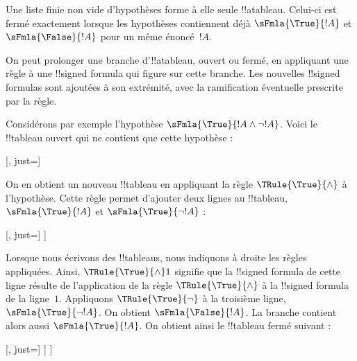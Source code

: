 \documentclass[../../../include/open-logic-section]{subfiles}
\begin{document}
\begin{ex}
  Une liste finie non vide d'hypothèses forme à elle seule
  !!a{tableau}. Celui-ci est fermé exactement lorsque les
  hypothèses contiennent déjà $\sFmla{\True}{!A}$ et
  $\sFmla{\False}{!A}$ pour un même énoncé~$!A$.

  On peut prolonger une branche d'!!a{tableau}, ouvert ou
  fermé, en appliquant une règle à une !!{signed formula} qui
  figure sur cette branche. Les nouvelles !!{signed formula}s
  sont ajoutées à son extrémité, avec la ramification éventuelle
  prescrite par la règle.

  Considérons par exemple l'hypothèse $\sFmla{\True}{!A \land \lnot
    !A}$. Voici le !!{tableau} ouvert qui ne contient que cette hypothèse :
  \begin{center}
    \begin{tableau}{}
      [, just=\TAss]
    \end{tableau}{}
  \end{center}
  On en obtient un nouveau !!{tableau} en appliquant la règle
  $\TRule{\True}{\land}$ à l'hypothèse. Cette règle permet d'ajouter
  deux lignes au !!{tableau}, $\sFmla{\True}{!A}$ et
  $\sFmla{\True}{\lnot !A}$ :
  \begin{center}
    \begin{tableau}{}
      [, just=\TAss
        [\sFmla{\True}{\formula{A}}, just={\TRule{\True}{\land}[1]},
          [\sFmla{\True}{\lnot \formula{A}}, just={\TRule{\True}{\land}[1]}
          ]
        ]
      ]
    \end{tableau}{}
  \end{center}
  Lorsque nous écrivons des !!{tableau}s, nous indiquons à droite les
  règles appliquées. Ainsi, $\TRule{\True}{\land} 1$ signifie que la
  !!{signed formula} de cette ligne résulte de l'application de la règle
  $\TRule{\True}{\land}$ à la !!{signed formula} de la ligne~$1$.
  Appliquons $\TRule{\True}{\lnot}$ à la troisième ligne,
  $\sFmla{\True}{\lnot !A}$. On obtient $\sFmla{\False}{!A}$.
  La branche contient alors aussi $\sFmla{\True}{!A}$.
  On obtient ainsi le !!{tableau} fermé suivant :
%
  \begin{center}
    \begin{tableau}{}
      [, just=\TAss
        [\sFmla{\True}{\formula{A}}, just={\TRule{\True}{\land}[1]}
          [\sFmla{\True}{\lnot \formula{A}}, just={\TRule{\True}{\land}[1]}
            [\sFmla{\False}{\formula{A}}, just={\TRule{\True}{\lnot}[3]}, close]
          ]
        ]
      ]
    \end{tableau}{}
  \end{center}
\end{ex}
\end{document}
